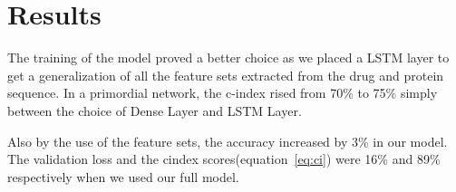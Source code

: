 \section{Results}
The training of the model proved a better choice as we placed a LSTM layer to get a generalization of all the feature sets extracted from the drug and protein sequence. In a primordial network, the c-index rised from 70\% to 75\% simply between the choice of Dense Layer and LSTM Layer. 

Also by the use of the feature sets, the accuracy increased by 3\% in our model. The validation loss and the cindex scores(equation~\ref{eq:ci}) were 16\% and 89\% respectively when we used our full model.

\iffalse The similarity measures are evaluated using \cite{Cock2009}. \fi

\iffalse
The accuracy plots and cindex plots are shown in Figure ~\ref{fig:results}
\begin{figure}
    
\end{figure}
\fi